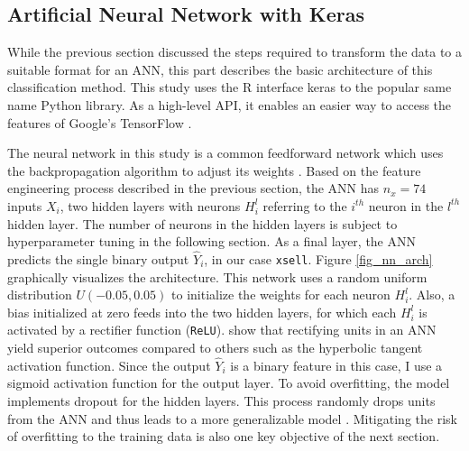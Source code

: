 \documentclass[12pt,a4paper]{article}
\newcommand{\pkg}[1]{{\normalfont\fontseries{b}\selectfont #1}}
\let\proglang=\textsf
\let\code=\texttt
\begin{document}
\subsection{Artificial Neural Network with Keras}

While the previous section discussed the steps required to transform the data to a suitable format for an ANN,
this part describes the basic architecture of this classification method.
This study uses the \proglang{R} interface \pkg{keras} \citep{cholletInterfaceKeras2017} to the popular same name \proglang{Python} library.
As a high-level API, it enables an easier way to access the features of Google's \pkg{TensorFlow} \citep{abadiTensorFlowLargeScaleMachine2015}.

The neural network in this study is a common feedforward network which uses the backpropagation algorithm to adjust its weights \citep{werbosBackpropagationTimeWhat1990}.
Based on the feature engineering process described in the previous section, the ANN has $n_x = 74$ inputs $X_i$, 
two hidden layers with neurons $H_i^l$ referring to the $i^{th}$ neuron in the $l^{th}$ hidden layer. 
The number of neurons in the hidden layers is subject to hyperparameter tuning in the following section.
As a final layer, the ANN predicts the single binary output $\hat{Y}_i$, in our case \code{xsell}.
Figure \ref{fig_nn_arch} graphically visualizes the architecture.
 \label{fig_nn_arch}
This network uses a random uniform distribution $U(-0.05, 0.05)$ to initialize the weights for each neuron $H_i^l$.
Also, a bias initialized at zero feeds into the two hidden layers, for which each $H_i^l$ is activated by a rectifier function (\code{ReLU}).
\cite{glorotDeepSparseRectifier2011} show that rectifying units in an ANN yield superior outcomes compared to others such as the hyperbolic tangent activation function. Since the output $\hat{Y}_i$ is a binary feature in this case, I use a sigmoid activation function for the output layer.
To avoid overfitting, the model implements dropout for the hidden layers.
This process randomly drops units from the ANN and thus leads to a more generalizable model \citep{srivastavaDropoutSimpleWay2014}.
Mitigating the risk of overfitting to the training data is also one key objective of the next section.
\end{document}
